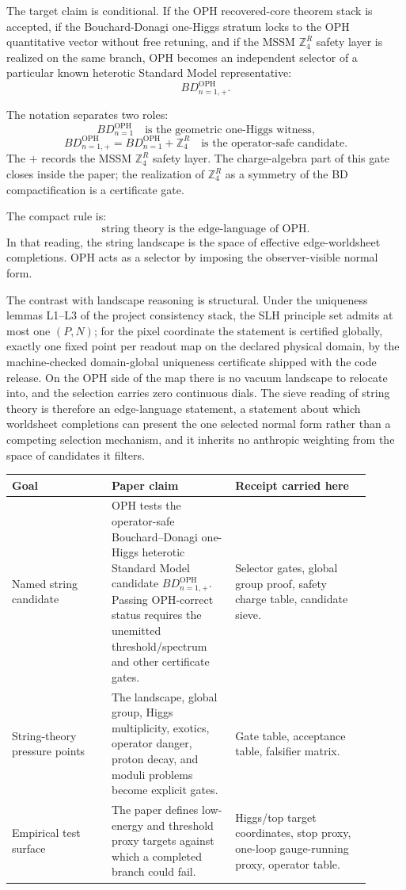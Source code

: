 \documentclass[11pt]{article}
\theoremstyle{remark}
\theoremstyle{plain}
\newcommand{\OPH}{\mathrm{OPH}}
\newcommand{\ZfourR}{\mathbb Z_4^R}
\begin{document}
The target claim is conditional. If the OPH recovered-core theorem stack is accepted, if the
Bouchard-Donagi one-Higgs stratum locks to the OPH quantitative vector without free retuning,
and if the MSSM \(\ZfourR\) safety layer is realized on the same branch, OPH becomes an
independent selector of a particular known heterotic Standard Model representative:
\[
BD_{n=1,+}^{\OPH}.
\]

The notation separates two roles:
\[
BD_{n=1}^{\OPH}
\quad
\text{is the geometric one-Higgs witness,}
\]
\[
BD_{n=1,+}^{\OPH}
 =
BD_{n=1}^{\OPH}+\ZfourR
\quad
\text{is the operator-safe candidate.}
\]
The \(+\) records the MSSM \(\ZfourR\) safety layer. The charge-algebra part of this gate closes
inside the paper; the realization of \(\ZfourR\) as a symmetry of the BD compactification is a
certificate gate.

The compact rule is:
\[
\text{string theory is the edge-language of OPH.}
\]
In that reading, the string landscape is the space of effective edge-worldsheet completions. OPH
acts as a selector by imposing the observer-visible normal form.

The contrast with landscape reasoning is structural. Under the uniqueness
lemmas L1--L3 of the project consistency stack,
the SLH principle set admits at most one \((P,N)\); for the pixel coordinate
the statement is certified globally, exactly one fixed point per readout map
on the declared physical domain, by the machine-checked domain-global
uniqueness certificate shipped with the code release.
On the OPH side of the map
there is no vacuum landscape to relocate into, and the selection carries zero
continuous dials. The sieve reading of string
theory is therefore an edge-language statement, a statement about which
worldsheet completions can present the one selected normal form rather than a
competing selection mechanism, and it inherits no anthropic weighting from
the space of candidates it filters.

\begin{center}
\small
\begin{tabular}{p{0.25\linewidth}p{0.31\linewidth}p{0.34\linewidth}}
\toprule
\textbf{Goal} & \textbf{Paper claim} & \textbf{Receipt carried here} \\
\midrule
Named string candidate & OPH tests the operator-safe Bouchard--Donagi one-Higgs heterotic
Standard Model candidate \(BD_{n=1,+}^{\OPH}\). Passing OPH-correct status requires the
unemitted threshold/spectrum and other certificate gates. & Selector gates, global group proof,
safety charge table, candidate sieve. \\
String-theory pressure points & The landscape, global group, Higgs multiplicity, exotics,
operator danger, proton decay, and moduli problems become explicit gates. & Gate table,
acceptance table, falsifier matrix. \\
Empirical test surface & The paper defines low-energy and threshold proxy targets
against which a completed branch could fail. & Higgs/top target coordinates, stop proxy,
one-loop gauge-running proxy, operator table. \\
\bottomrule
\end{tabular}
\end{center}
\end{document}
